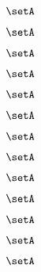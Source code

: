\begin{forslides}
    \begin{equation}
        \label{eq:slides-translation-64}
        \setA
    \end{equation}

    \begin{equation}
        \label{eq:slides-translation-65}
        \setA
    \end{equation}

    \begin{equation}
        \label{eq:slides-translation-66}
        \setA
    \end{equation}

    \begin{equation}
        \label{eq:slides-translation-67}
        \setA
    \end{equation}

    \begin{equation}
        \label{eq:slides-translation-68}
        \setA
    \end{equation}

    \begin{equation}
        \label{eq:slides-translation-69}
        \setA
    \end{equation}
    
    \begin{equation}
        \label{eq:slides-translation-70}
        \setA
    \end{equation}

    \begin{equation}
        \label{eq:slides-translation-71}
        \setA
    \end{equation}

    \begin{equation}
        \label{eq:slides-translation-72}
        \setA
    \end{equation}

    \begin{equation}
        \label{eq:slides-translation-73}
        \setA
    \end{equation}

    \begin{equation}
        \label{eq:slides-translation-74}
        \setA
    \end{equation}

    \begin{equation}
        \label{eq:slides-translation-75}
        \setA
    \end{equation}

    \begin{equation}
        \label{eq:slides-translation-76}
        \setA
    \end{equation}


\end{forslides}
